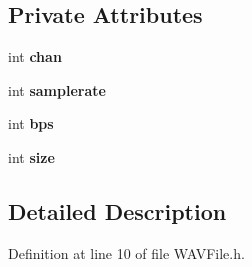 \subsection*{Private Attributes}
\begin{DoxyCompactItemize}
\item 
int {\bfseries chan}\hypertarget{class_i_o_1_1_audio_1_1_file_1_1_w_a_vfile_aaaeb842cbe2b812bf870b83cc7dfc7e3}{}\label{class_i_o_1_1_audio_1_1_file_1_1_w_a_vfile_aaaeb842cbe2b812bf870b83cc7dfc7e3}

\item 
int {\bfseries samplerate}\hypertarget{class_i_o_1_1_audio_1_1_file_1_1_w_a_vfile_a2aebfb66ff90245e1a6045dae4310283}{}\label{class_i_o_1_1_audio_1_1_file_1_1_w_a_vfile_a2aebfb66ff90245e1a6045dae4310283}

\item 
int {\bfseries bps}\hypertarget{class_i_o_1_1_audio_1_1_file_1_1_w_a_vfile_af2d963c3d7b2e83fbff0b1e40db3510f}{}\label{class_i_o_1_1_audio_1_1_file_1_1_w_a_vfile_af2d963c3d7b2e83fbff0b1e40db3510f}

\item 
int {\bfseries size}\hypertarget{class_i_o_1_1_audio_1_1_file_1_1_w_a_vfile_ab00a77b336408e87adf54289632ebde6}{}\label{class_i_o_1_1_audio_1_1_file_1_1_w_a_vfile_ab00a77b336408e87adf54289632ebde6}

\end{DoxyCompactItemize}


\subsection{Detailed Description}


Definition at line 10 of file W\+A\+V\+File.\+h.

